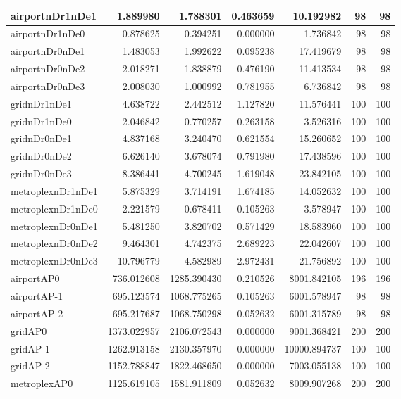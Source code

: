 \begin{longtable}{|l|r|r|r|r|r|r|}
\endlastfoot
airportnDr1nDe1 & 1.889980 & 1.788301 & 0.463659 & 10.192982 & 98 & 98 \\ \hline
airportnDr1nDe0 & 0.878625 & 0.394251 & 0.000000 & 1.736842 & 98 & 98 \\ \hline
airportnDr0nDe1 & 1.483053 & 1.992622 & 0.095238 & 17.419679 & 98 & 98 \\ \hline
airportnDr0nDe2 & 2.018271 & 1.838879 & 0.476190 & 11.413534 & 98 & 98 \\ \hline
airportnDr0nDe3 & 2.008030 & 1.000992 & 0.781955 & 6.736842 & 98 & 98 \\ \hline
gridnDr1nDe1 & 4.638722 & 2.442512 & 1.127820 & 11.576441 & 100 & 100 \\ \hline
gridnDr1nDe0 & 2.046842 & 0.770257 & 0.263158 & 3.526316 & 100 & 100 \\ \hline
gridnDr0nDe1 & 4.837168 & 3.240470 & 0.621554 & 15.260652 & 100 & 100 \\ \hline
gridnDr0nDe2 & 6.626140 & 3.678074 & 0.791980 & 17.438596 & 100 & 100 \\ \hline
gridnDr0nDe3 & 8.386441 & 4.700245 & 1.619048 & 23.842105 & 100 & 100 \\ \hline
metroplexnDr1nDe1 & 5.875329 & 3.714191 & 1.674185 & 14.052632 & 100 & 100 \\ \hline
metroplexnDr1nDe0 & 2.221579 & 0.678411 & 0.105263 & 3.578947 & 100 & 100 \\ \hline
metroplexnDr0nDe1 & 5.481250 & 3.820702 & 0.571429 & 18.583960 & 100 & 100 \\ \hline
metroplexnDr0nDe2 & 9.464301 & 4.742375 & 2.689223 & 22.042607 & 100 & 100 \\ \hline
metroplexnDr0nDe3 & 10.796779 & 4.582989 & 2.972431 & 21.756892 & 100 & 100 \\ \hline
airportAP0 & 736.012608 & 1285.390430 & 0.210526 & 8001.842105 & 196 & 196 \\ \hline
airportAP-1 & 695.123574 & 1068.775265 & 0.105263 & 6001.578947 & 98 & 98 \\ \hline
airportAP-2 & 695.217687 & 1068.750298 & 0.052632 & 6001.315789 & 98 & 98 \\ \hline
gridAP0 & 1373.022957 & 2106.072543 & 0.000000 & 9001.368421 & 200 & 200 \\ \hline
gridAP-1 & 1262.913158 & 2130.357970 & 0.000000 & 10000.894737 & 100 & 100 \\ \hline
gridAP-2 & 1152.788847 & 1822.468650 & 0.000000 & 7003.055138 & 100 & 100 \\ \hline
metroplexAP0 & 1125.619105 & 1581.911809 & 0.052632 & 8009.907268 & 200 & 200 \\ \hline

\end{longtable}
